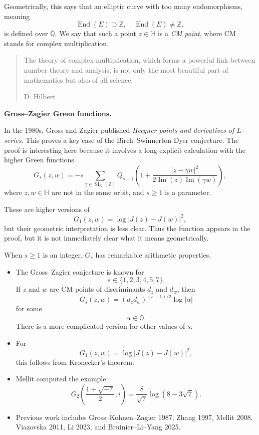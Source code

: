 Geometrically, this says that an
elliptic curve with too many
endomorphisms, meaning
\[
        \operatorname{End}(E)
        \supset \mathbb Z,\quad
        \operatorname{End}(E)\not =
        \mathbb Z,
\]
is defined over $\overline{\mathbb Q}$.
We say that such a point
$z\in\mathbb H$ is a {\it CM point},
where CM stands for complex
multiplication.

\begin{quote}
The theory of complex multiplication,
which forms a powerful link between
number theory and analysis, is not
only the most beautiful part of
mathematics but also of all science.

\hfill D. Hilbert
\end{quote}

\medskip\noindent
{\bf Gross--Zagier Green functions.}

In the 1980s, Gross and Zagier
published
{\it Heegner points and derivatives of
$L$-series}.
This proves a key case of the
Birch--Swinnerton-Dyer conjecture.
The proof is interesting here because
it involves a long explicit
calculation with the higher Green
functions
\[
        G_s(z,w)
        =
        -s
        \sum_{\gamma\in
        \operatorname{SL}_2(\mathbb Z)}
        Q_{s-1}
        \left(
        1+
        \frac{|z-\gamma w|^2}
        {2\operatorname{Im}(z)
        \operatorname{Im}(\gamma w)}
        \right),
\]
where $z,w\in\mathbb H$ are not in
the same orbit, and $s\geq 1$ is a
parameter.

These are higher versions of
\[
        G_1(z,w)=\log|J(z)-J(w)|^2,
\]
but their geometric interpretation is
less clear.
Thus the function appears in the
proof, but it is not immediately clear
what it means geometrically.

When $s\geq 1$ is an integer, $G_s$
has remarkable arithmetic properties.

\begin{itemize}
\item The Gross--Zagier conjecture is
known for
\[
        s\in\{1,2,3,4,5,7\}.
\]
If $z$ and $w$ are CM points of
discriminants $d_z$ and $d_w$, then
\[
        G_s(z,w)
        =
        (d_zd_w)^{(s-1)/2}
        \log|\alpha|
\]
for some
\[
        \alpha\in\overline{\mathbb Q}.
\]
There is a more complicated version
for other values of $s$.
\item For
\[
        G_1(z,w)=\log|J(z)-J(w)|^2,
\]
this follows from Kronecker's theorem.
\item Mellit computed the example
\[
        G_2\left(
        \frac{1+\sqrt{-7}}{2},i
        \right)
        =
        \frac{8}{\sqrt 7}
        \log(8-3\sqrt 7).
\]
\item Previous work includes
Gross--Kohnen--Zagier 1987,
Zhang 1997, Mellit 2008,
Viazovska 2011, Li 2023, and
Bruinier--Li--Yang 2025.
\end{itemize}

